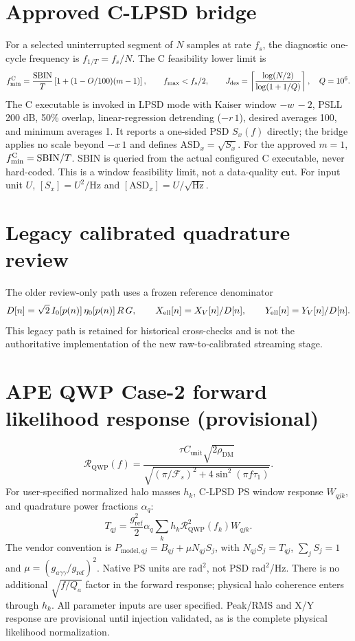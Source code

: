 \documentclass{article}
\begin{document}
\section*{Approved C-LPSD bridge}
For a selected uninterrupted segment of $N$ samples at rate $f_s$, the
diagnostic one-cycle frequency is $f_{1/T}=f_s/N$. The C feasibility lower
limit is
\begin{equation}
f_{\min}^{\rm C}=\frac{\mathrm{SBIN}}{T}
\left[1+(1-O/100)(m-1)\right],
\qquad
f_{\max}<f_s/2,
\qquad
J_{\rm des}=\left\lceil
\frac{\log(N/2)}{\log(1+1/Q)}
\right\rceil,
\quad Q=10^6.
\end{equation}
The C executable is invoked in LPSD mode with Kaiser window $-w\,-2$, PSLL
200 dB, 50\% overlap, linear-regression detrending ($-r\,1$), desired averages
100, and minimum averages 1. It reports a one-sided PSD $S_x(f)$ directly; the
bridge applies no scale beyond $-x\,1$ and defines
$\mathrm{ASD}_x=\sqrt{S_x}$. For the approved $m=1$,
$f_{\min}^{\rm C}=\mathrm{SBIN}/T$. SBIN is queried from the actual
configured C executable, never hard-coded. This is a window feasibility limit,
not a data-quality cut. For input unit $U$, $[S_x]=U^2/\mathrm{Hz}$ and
$[\mathrm{ASD}_x]=U/\sqrt{\mathrm{Hz}}$.

\section*{Legacy calibrated quadrature review}
The older review-only path uses a frozen reference denominator
\begin{equation}
D[n]=\sqrt{2}\,I_0[p(n)]\,\eta_0[p(n)]\,R\,G,
\qquad
X_{\rm ell}[n]=X_V[n]/D[n],
\qquad
Y_{\rm ell}[n]=Y_V[n]/D[n].
\end{equation}
This legacy path is retained for historical cross-checks and is not the
authoritative implementation of the new raw-to-calibrated streaming stage.

\section*{APE QWP Case-2 forward likelihood response (provisional)}
\begin{equation}
\mathcal R_{\mathrm{QWP}}(f)=
\frac{\tau C_{\mathrm{unit}}\sqrt{2\rho_{\mathrm{DM}}}}
{\sqrt{(\pi/\mathcal F_s)^2+4\sin^2(\pi f\tau_1)}}.
\end{equation}
For user-specified normalized halo masses $h_k$, C-LPSD PS window
response $W_{qjk}$, and quadrature power fractions $\alpha_q$:
\begin{equation}
T_{qj}=\frac{g_{\mathrm{ref}}^2}{2}\alpha_q
\sum_k h_k\mathcal R_{\mathrm{QWP}}^2(f_k)W_{qjk}.
\end{equation}
The vendor convention is $P_{\mathrm{model},qj}=B_{qj}+
\mu N_{qj}S_j$, with $N_{qj}S_j=T_{qj}$,
$\sum_j S_j=1$ and $\mu=(g_{a\gamma\gamma}/g_{\mathrm{ref}})^2$.
Native PS units are rad$^2$, not PSD rad$^2$/Hz.
There is no additional $\sqrt{f/Q_a}$ factor in the forward
response; physical halo coherence enters through $h_k$.
All parameter inputs are user specified. Peak/RMS and X/Y response
are provisional until injection validated, as is the complete
physical likelihood normalization.
\end{document}
